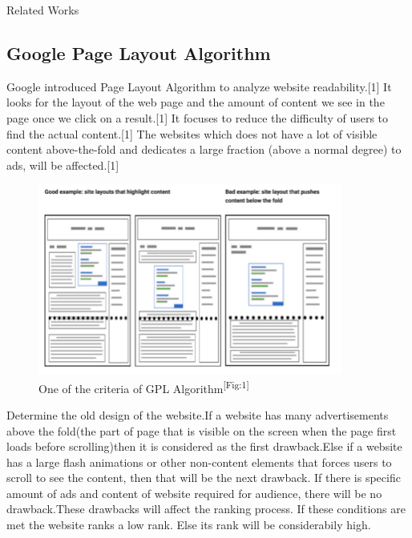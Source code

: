 \documentclass[11pt]{beamer}
\begin{document}
	\begin{frame}{Related Works}
		\begin{itemize}
			
		\section{Google Page Layout Algorithm}
		Google introduced Page Layout Algorithm to analyze website
		readability.[1] It looks for the layout of the web page and the amount of
		content we see in the page once we click on a result.[1] It focuses to reduce the difficulty of users to find the actual
		content.[1]
		The websites which does not have a lot of visible content
		above-the-fold and dedicates a large fraction (above a normal
		degree) to ads, will be affected.[1]
		\begin{figure}
			
			\includegraphics[width=10cm]{image/gpa.png}
			\caption{One of the criteria of GPL Algorithm\textsuperscript{[Fig:1]}}
			\label{fig1:gpa}
			
		\end{figure}
		
		
		Determine the old design of the website.If a website has many advertisements above the fold(the part of page that is visible on the screen when the page first loads before scrolling)then it is considered as the first drawback.Else if a website has a large flash animations or other
		non-content elements that forces users to scroll to see the content, then that will be the next drawback. If there is specific amount of ads and content of website required for audience, there will be no drawback.These drawbacks will affect the ranking process. If these conditions are met the website ranks a low rank. Else its rank will be considerabily high.
		
		
			
	
			
		\end{itemize}
	\end{frame}
\end{document}
